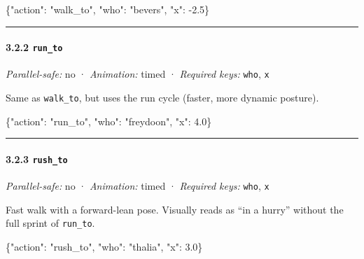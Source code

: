 \documentclass[
  11pt,
]{book}
\newenvironment{Shaded}{}{}
\newcommand{\DataTypeTok}[1]{\textcolor[rgb]{0.56,0.13,0.00}{#1}}
\newcommand{\FloatTok}[1]{\textcolor[rgb]{0.25,0.63,0.44}{#1}}
\newcommand{\FunctionTok}[1]{\textcolor[rgb]{0.02,0.16,0.49}{#1}}
\newcommand{\StringTok}[1]{\textcolor[rgb]{0.25,0.44,0.63}{#1}}
\begin{document}
\begin{Shaded}
\begin{Highlighting}[]
\FunctionTok{\{}\DataTypeTok{"action"}\FunctionTok{:} \StringTok{"walk\_to"}\FunctionTok{,} \DataTypeTok{"who"}\FunctionTok{:} \StringTok{"bevers"}\FunctionTok{,} \DataTypeTok{"x"}\FunctionTok{:} \FloatTok{{-}2.5}\FunctionTok{\}}
\end{Highlighting}
\end{Shaded}

\begin{center}\rule{0.5\linewidth}{0.5pt}\end{center}

\paragraph{\texorpdfstring{3.2.2
\texttt{run\_to}}{3.2.2 run\_to}}\label{run_to}

\emph{Parallel-safe:} no · \emph{Animation:} timed · \emph{Required
keys:} \texttt{who}, \texttt{x}

Same as \texttt{walk\_to}, but uses the run cycle (faster, more dynamic
posture).

\begin{Shaded}
\begin{Highlighting}[]
\FunctionTok{\{}\DataTypeTok{"action"}\FunctionTok{:} \StringTok{"run\_to"}\FunctionTok{,} \DataTypeTok{"who"}\FunctionTok{:} \StringTok{"freydoon"}\FunctionTok{,} \DataTypeTok{"x"}\FunctionTok{:} \FloatTok{4.0}\FunctionTok{\}}
\end{Highlighting}
\end{Shaded}

\begin{center}\rule{0.5\linewidth}{0.5pt}\end{center}

\paragraph{\texorpdfstring{3.2.3
\texttt{rush\_to}}{3.2.3 rush\_to}}\label{rush_to}

\emph{Parallel-safe:} no · \emph{Animation:} timed · \emph{Required
keys:} \texttt{who}, \texttt{x}

Fast walk with a forward-lean pose. Visually reads as ``in a hurry''
without the full sprint of \texttt{run\_to}.

\begin{Shaded}
\begin{Highlighting}[]
\FunctionTok{\{}\DataTypeTok{"action"}\FunctionTok{:} \StringTok{"rush\_to"}\FunctionTok{,} \DataTypeTok{"who"}\FunctionTok{:} \StringTok{"thalia"}\FunctionTok{,} \DataTypeTok{"x"}\FunctionTok{:} \FloatTok{3.0}\FunctionTok{\}}
\end{Highlighting}
\end{Shaded}
\end{document}
